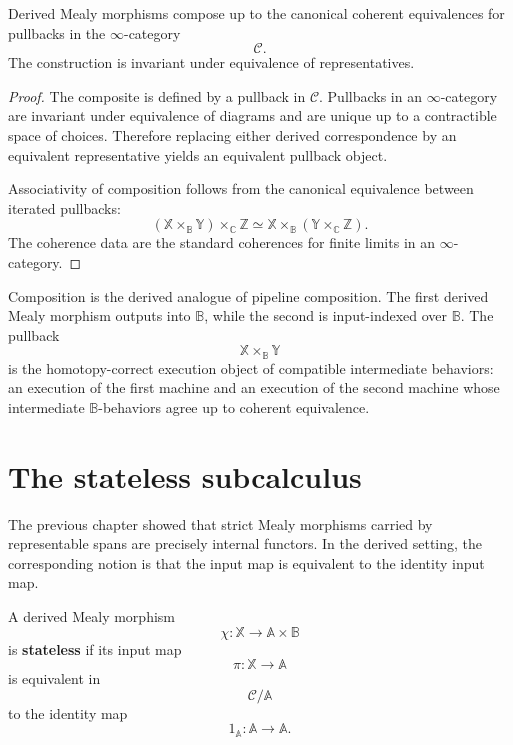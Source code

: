 \begin{proposition}
\label{prop:composition-derived-mealy-rewritten}
Derived Mealy morphisms compose up to the canonical coherent
equivalences for pullbacks in the \(\infty\)-category
\[
\mathcal C.
\]
The construction is invariant under equivalence of representatives.
\end{proposition}

\begin{proof}
The composite is defined by a pullback in \(\mathcal C\). Pullbacks in an
\(\infty\)-category are invariant under equivalence of diagrams and are
unique up to a contractible space of choices. Therefore replacing either
derived correspondence by an equivalent representative yields an
equivalent pullback object.

Associativity of composition follows from the canonical equivalence
between iterated pullbacks:
\[
(\mathbb X\times_{\mathbb B}\mathbb Y)\times_{\mathbb C}\mathbb Z
\simeq
\mathbb X\times_{\mathbb B}
(\mathbb Y\times_{\mathbb C}\mathbb Z).
\]
The coherence data are the standard coherences for finite limits in an
\(\infty\)-category.
\end{proof}

\begin{remark}
\label{rem:derived-pipeline-interpretation-rewritten}
Composition is the derived analogue of pipeline composition. The first
derived Mealy morphism outputs into \(\mathbb B\), while the second is
input-indexed over \(\mathbb B\). The pullback
\[
\mathbb X\times_{\mathbb B}\mathbb Y
\]
is the homotopy-correct execution object of compatible intermediate
behaviors: an execution of the first machine and an execution of the
second machine whose intermediate \(\mathbb B\)-behaviors agree up to
coherent equivalence.
\end{remark}

\section{The stateless subcalculus}
\label{sec:stateless-subcalculus-derived-rewritten}

The previous chapter showed that strict Mealy morphisms carried by
representable spans are precisely internal functors. In the derived
setting, the corresponding notion is that the input map is equivalent to
the identity input map.

\begin{definition}
\label{def:stateless-derived-mealy-rewritten}
A derived Mealy morphism
\[
\chi:\mathbb X\to\mathbb A\times\mathbb B
\]
is \textbf{stateless} if its input map
\[
\pi:\mathbb X\to\mathbb A
\]
is equivalent in
\[
\mathcal C/\mathbb A
\]
to the identity map
\[
1_{\mathbb A}:\mathbb A\to\mathbb A.
\]
\end{definition}

